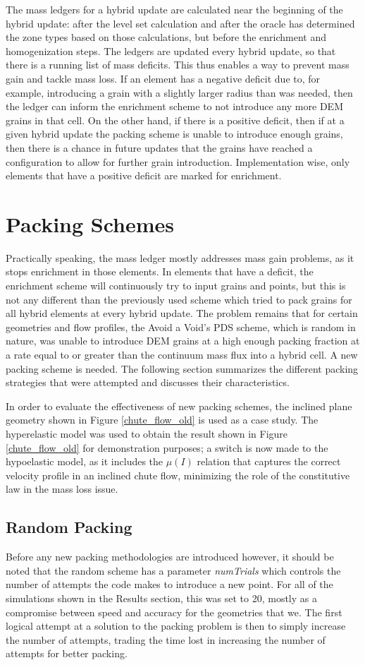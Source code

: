 The mass ledgers for a hybrid update are calculated near the beginning of the hybrid update: after the level set calculation and after the oracle has determined the zone types based on those calculations, but before the enrichment and homogenization steps. The ledgers are updated every hybrid update, so that there is a running list of mass deficits. This thus enables a way to prevent mass gain and tackle mass loss. If an element has a negative deficit due to, for example, introducing a grain with a slightly larger radius than was needed, then the ledger can inform the enrichment scheme to not introduce any more DEM grains in that cell. On the other hand, if there is a positive deficit, then if at a given hybrid update the packing scheme is unable to introduce enough grains, then there is a chance in future updates that the grains have reached a configuration to allow for further grain introduction. Implementation wise, only elements that have a positive deficit are marked for enrichment.

\section{Packing Schemes}
Practically speaking, the mass ledger mostly addresses mass gain problems, as it stops enrichment in those elements. In elements that have a deficit, the enrichment scheme will continuously try to input grains and points, but this is not any different than the previously used scheme which tried to pack grains for all hybrid elements at every hybrid update. The problem remains that for certain geometries and flow profiles, the Avoid a Void's PDS scheme, which is random in nature, was unable to introduce DEM grains at a high enough packing fraction at a rate equal to or greater than the continuum mass flux into a hybrid cell. A new packing scheme is needed. The following section summarizes the different packing strategies that were attempted and discusses their characteristics.

In order to evaluate the effectiveness of new packing schemes, the inclined plane geometry shown in Figure \ref{chute_flow_old} is used as a case study. The hyperelastic model was used to obtain the result shown in Figure \ref{chute_flow_old} for demonstration purposes; a switch is now made to the hypoelastic model, as it includes the $\mu(I)$ relation that captures the correct velocity profile in an inclined chute flow, minimizing the role of the constitutive law in the mass loss issue.

\subsection{Random Packing}
Before any new packing methodologies are introduced however, it should be noted that the random scheme has a parameter \textit{numTrials} which controls the number of attempts the code makes to introduce a new point. For all of the simulations shown in the Results section, this was set to 20, mostly as a compromise between speed and accuracy for the geometries that we. The first logical attempt at a solution to the packing problem is then to simply increase the number of attempts, trading the time lost in increasing the number of attempts for better packing. 

